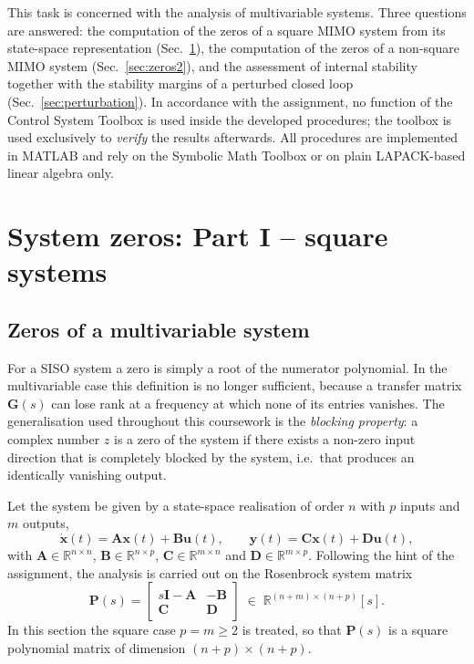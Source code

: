 
This task is concerned with the analysis of multivariable systems. Three questions are
answered: the computation of the zeros of a square MIMO system from its state-space
representation (Sec.~\ref{sec:zeros1}), the computation of the zeros of a non-square MIMO
system (Sec.~\ref{sec:zeros2}), and the assessment of internal stability together with the
stability margins of a perturbed closed loop (Sec.~\ref{sec:perturbation}). In accordance with
the assignment, no function of the Control System Toolbox is used inside the developed
procedures; the toolbox is used exclusively to \emph{verify} the results afterwards. All
procedures are implemented in MATLAB and rely on the Symbolic Math Toolbox or on plain
LAPACK-based linear algebra only.

\section{System zeros: Part I -- square systems}
\label{sec:zeros1}

\subsection{Zeros of a multivariable system}

For a SISO system a zero is simply a root of the numerator polynomial. In the multivariable
case this definition is no longer sufficient, because a transfer matrix $\mathbf{G}(s)$ can lose
rank at a frequency at which none of its entries vanishes. The generalisation used throughout
this coursework is the \emph{blocking property}: a complex number $z$ is a zero of the system if
there exists a non-zero input direction that is completely blocked by the system, i.e.\ that
produces an identically vanishing output.

Let the system be given by a state-space realisation of order $n$ with $p$ inputs and $m$
outputs,
\begin{equation}
    \dot{\mathbf{x}}(t) = \mathbf{A}\mathbf{x}(t) + \mathbf{B}\mathbf{u}(t), \qquad
    \mathbf{y}(t) = \mathbf{C}\mathbf{x}(t) + \mathbf{D}\mathbf{u}(t),
    \label{eq:statespace}
\end{equation}
with $\mathbf{A}\in\mathbb{R}^{n\times n}$, $\mathbf{B}\in\mathbb{R}^{n\times p}$,
$\mathbf{C}\in\mathbb{R}^{m\times n}$ and $\mathbf{D}\in\mathbb{R}^{m\times p}$. Following the
hint of the assignment, the analysis is carried out on the Rosenbrock system matrix
\begin{equation}
    \mathbf{P}(s) =
    \begin{bmatrix}
        s\mathbf{I}-\mathbf{A} & -\mathbf{B} \\[2pt]
        \mathbf{C}             &  \mathbf{D}
    \end{bmatrix}
    \;\in\; \mathbb{R}^{(n+m)\times(n+p)}[s].
    \label{eq:rosenbrock}
\end{equation}
In this section the square case $p=m\geq 2$ is treated, so that $\mathbf{P}(s)$ is a square
polynomial matrix of dimension $(n+p)\times(n+p)$.

